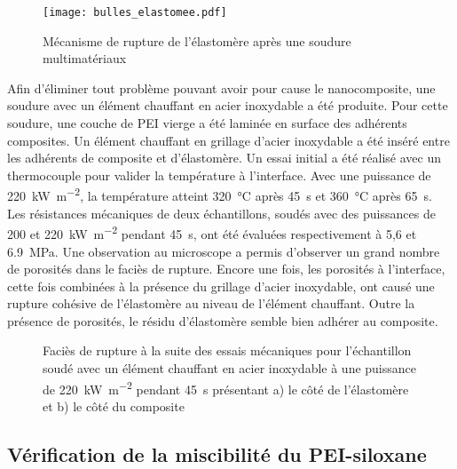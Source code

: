 \begin{figure}[h]
	\centering
	\texttt{[image: bulles\_elastomee.pdf]}
	\caption{Mécanisme de rupture de l'élastomère après une soudure multimatériaux}
	\label{fig:bulles_elastomere}
\end{figure}

Afin d'éliminer tout problème pouvant avoir pour cause le nanocomposite, une soudure avec un élément chauffant en acier inoxydable a été produite. 
Pour cette soudure, une couche de PEI vierge a été laminée en surface des adhérents composites.
Un élément chauffant en grillage d'acier inoxydable a été inséré entre les adhérents de composite et d'élastomère. 
Un essai initial a été réalisé avec un thermocouple pour valider la température à l'interface. 
Avec une puissance de \SI[locale=FR]{220}{\kilo\watt\per\square\metre}, la température atteint \SI[locale=FR]{320}{\celsius} après \SI[locale=FR]{45}{\second} et \SI[locale=FR]{360}{\celsius} après \SI[locale=FR]{65}{\second}. 
Les résistances mécaniques de deux échantillons, soudés avec des puissances de 200 et \SI[locale=FR]{220}{\kilo\watt\per\square\metre} pendant \SI[locale=FR]{45}{\second}, ont été évaluées respectivement à 5,6 et \SI[locale=FR]{6,9}{\mega\pascal}. 
Une observation au microscope a permis d'observer un grand nombre de porosités dans le faciès de rupture. 
Encore une fois, les porosités à l'interface, cette fois combinées à la présence du grillage d'acier inoxydable, ont causé une rupture cohésive de l'élastomère au niveau de l'élément chauffant. 
Outre la présence de porosités, le résidu d'élastomère semble bien adhérer au composite.  

\begin{figure}[h]
	\centering
	 \qquad
	\caption{Faciès de rupture à la suite des essais mécaniques pour l'échantillon soudé avec un élément chauffant en acier inoxydable à une puissance de \SI{220}{\kilo\watt\per\square\metre} pendant \SI{45}{\second} présentant a) le côté de l'élastomère et b) le côté du composite}
	\label{fig:STM1500_facies_soudure_SS}
\end{figure}

\FloatBarrier
\subsection{Vérification de la miscibilité du PEI-siloxane}

